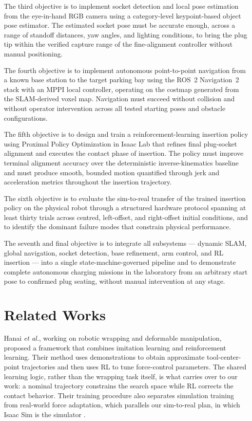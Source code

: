 \documentclass[10pt]{article}
\begin{document}
The third objective is to implement socket detection and local pose estimation from the eye-in-hand RGB camera using a category-level keypoint-based object pose estimator. The estimated socket pose must be accurate enough, across a range of standoff distances, yaw angles, and lighting conditions, to bring the plug tip within the verified capture range of the fine-alignment controller without manual positioning.

The fourth objective is to implement autonomous point-to-point navigation from a known base station to the target parking bay using the ROS~2 Navigation~2 stack with an MPPI local controller, operating on the costmap generated from the SLAM-derived voxel map. Navigation must succeed without collision and without operator intervention across all tested starting poses and obstacle configurations.

The fifth objective is to design and train a reinforcement-learning insertion policy using Proximal Policy Optimization in Isaac Lab that refines final plug-socket alignment and executes the contact phase of insertion. The policy must improve terminal alignment accuracy over the deterministic inverse-kinematics baseline and must produce smooth, bounded motion quantified through jerk and acceleration metrics throughout the insertion trajectory.

The sixth objective is to evaluate the sim-to-real transfer of the trained insertion policy on the physical robot through a structured hardware protocol spanning at least thirty trials across centred, left-offset, and right-offset initial conditions, and to identify the dominant failure modes that constrain physical performance.

The seventh and final objective is to integrate all subsystems — dynamic SLAM, global navigation, socket detection, base refinement, arm control, and RL insertion — into a single state-machine-governed pipeline and to demonstrate complete autonomous charging missions in the laboratory from an arbitrary start pose to confirmed plug seating, without manual intervention at any stage.

\section{Related Works}

Hanai \textit{et al.}, working on robotic wrapping and deformable manipulation, proposed a framework that combines imitation learning and reinforcement learning. Their method uses demonstrations to obtain approximate tool-center-point trajectories and then uses RL to tune force-control parameters. The shared learning logic, rather than the wrapping task itself, is what carries over to our work: a nominal trajectory constrains the search space while RL corrects the contact behavior. Their training procedure also separates simulation training from real-world force adaptation, which parallels our sim-to-real plan, in which Isaac Sim is the simulator \cite{hanai2025wrapping}.
\end{document}
